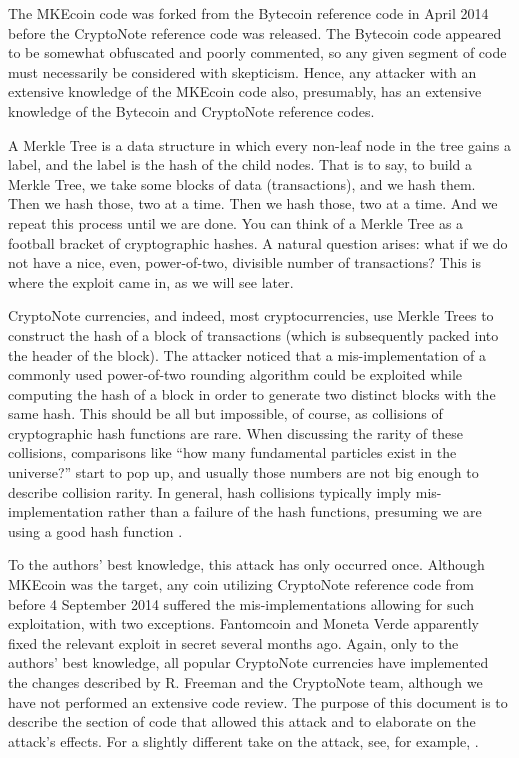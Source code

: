 \documentclass{mrl}
\begin{document}
The MKEcoin code was forked from the Bytecoin reference code in April 2014 before the CryptoNote reference code was released. The Bytecoin code appeared to be somewhat obfuscated and poorly commented, so any given segment of code must necessarily be considered with skepticism. Hence, any attacker with an extensive knowledge of the MKEcoin code also, presumably, has an extensive knowledge of the Bytecoin and CryptoNote reference codes.

A Merkle Tree is a data structure in which every non-leaf node in the tree gains a label, and the label is the hash of the child nodes\cite{merkle1988digital}. That is to say, to build a Merkle Tree, we take some blocks of data (transactions), and we hash them. Then we hash those, two at a time. Then we hash those, two at a time. And we repeat this process until we are done. You can think of a Merkle Tree as a football bracket of cryptographic hashes. A natural question arises: what if we do not have a nice, even, power-of-two, divisible number of transactions? This is where the exploit came in, as we will see later.

CryptoNote currencies, and indeed, most cryptocurrencies, use Merkle Trees to construct the hash of a block of transactions (which is subsequently packed into the header of the block). The attacker noticed that a mis-implementation of a commonly used power-of-two rounding algorithm could be exploited while computing the hash of a block in order to generate two distinct blocks with the same hash. This should be all but impossible, of course, as collisions of cryptographic hash functions are rare. When discussing the rarity of these collisions, comparisons like ``how many fundamental particles exist in the universe?'' start to pop up, and usually those numbers are not big enough to describe collision rarity. In general, hash collisions typically imply mis-implementation rather than a failure of the hash functions, presuming we are using a good hash function \cite{anderson1993classification}.

To the authors' best knowledge, this attack has only occurred once. Although MKEcoin was the target, any coin utilizing CryptoNote reference code from before 4 September 2014 suffered the mis-implementations allowing for such exploitation, with two exceptions. Fantomcoin and Moneta Verde apparently fixed the relevant exploit in secret several months ago. Again, only to the authors' best knowledge, all popular CryptoNote currencies have implemented the changes described by R. Freeman and the CryptoNote team, although we have not performed an extensive code review. The purpose of this document is to describe the section of code that allowed this attack and to elaborate on the attack's effects. For a slightly different take on the attack, see, for example, \cite{CryptoNote:2014}.
\end{document}
